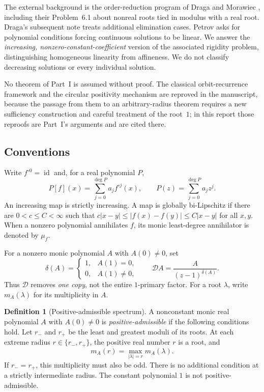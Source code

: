 \documentclass[11pt,letterpaper]{article}
\theoremstyle{definition}
\newtheorem{definition}[theorem]{Definition}
\theoremstyle{remark}
\newcommand{\id}{\operatorname{id}}
\newcommand{\itn}[2]{#1^{\circ #2}}
\newcommand{\scD}{\mathcal D}
\begin{document}
The external background is the order-reduction program of Draga and Morawiec
\cite{DM2016}, including their Problem~6.1 about nonreal roots tied in modulus
with a real root. Draga's subsequent note \cite{D2016} treats additional
elimination cases. Petrov \cite{Petrov2016} asks for polynomial conditions
forcing continuous solutions to be linear. We answer the \emph{increasing,
nonzero-constant-coefficient} version of the associated rigidity problem,
distinguishing homogeneous linearity from affineness. We do not classify
decreasing solutions or every individual solution.

No theorem of Part~I is assumed without proof. The classical orbit-recurrence
framework and the circular positivity mechanism are reproved in the
manuscript, because the passage from them to an arbitrary-radius theorem
requires a new sufficiency construction and careful treatment of the
root~$1$; in this report those reproofs are Part~I's arguments and are cited
there.

\subsection{Conventions}

Write $\itn{f}{0}=\id$ and, for a real polynomial $P$,
\begin{equation}
 P[f](x)=\sum_{j=0}^{\deg P}a_j\itn{f}{j}(x),
 \qquad P(z)=\sum_{j=0}^{\deg P}a_jz^j.
 \label{nrr:sc:eq:iterative}
\end{equation}
An increasing map is strictly increasing. A map is globally bi-Lipschitz
if there are $0<c\le C<\infty$ such that
$c|x-y|\le |f(x)-f(y)|\le C|x-y|$ for all $x,y$.
When a nonzero polynomial annihilates $f$, its monic least-degree
annihilator is denoted by $\mu_f$.

For a nonzero monic polynomial $A$ with $A(0)\ne0$, set
\begin{equation}
 \delta(A)=\begin{cases}1,&A(1)=0,\\0,&A(1)\ne0,\end{cases}
 \qquad
 \scD A=\frac{A}{(z-1)^{\delta(A)}}.
 \label{nrr:sc:eq:D}
\end{equation}
Thus $\scD$ removes \emph{one copy}, not the entire $1$-primary factor.
For a root $\lambda$, write $m_A(\lambda)$ for its multiplicity in $A$.

\begin{definition}[Positive-admissible spectrum]
\label{nrr:sc:def:admissible}
A nonconstant monic real polynomial $A$ with $A(0)\ne0$ is
\emph{positive-admissible} if the following conditions hold.
Let $r_-$ and $r_+$ be the least and greatest moduli of its roots.
At each extreme radius $r\in\{r_-,r_+\}$, the positive real number $r$
is a root, and
\begin{equation}
 m_A(r)=\max_{|\lambda|=r}m_A(\lambda).
 \label{nrr:sc:eq:dominance}
\end{equation}
If $r_-=r_+$, this multiplicity must also be odd.
There is no additional condition at a strictly intermediate radius.
The constant polynomial $1$ is not positive-admissible.
\end{definition}
\end{document}
